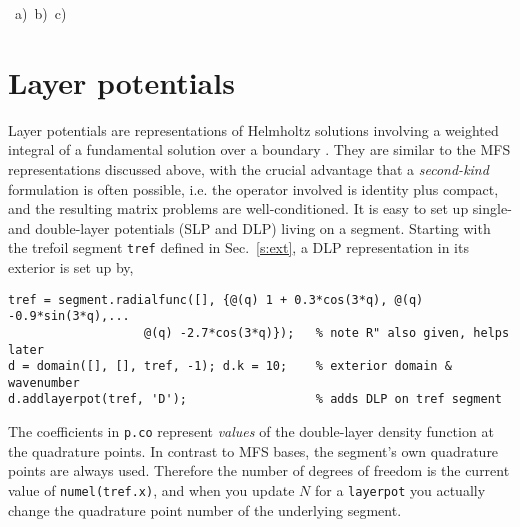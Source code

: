 \bfi %

\mbox{%
\hspace{-5ex}
a)
b)
c)
}%
\efi

\section{Layer potentials}
\label{s:layer}

Layer potentials are representations of Helmholtz solutions
involving a weighted integral of a fundamental solution
over a boundary \cite{coltonkress}.
They are similar to the MFS representations discussed above, with the
crucial advantage that a {\em second-kind}
formulation is often possible, i.e. the operator involved is
identity plus compact, and the resulting matrix problems are well-conditioned.
It is easy to set up single- and double-layer potentials (SLP and
DLP) living on a segment.
Starting with the trefoil segment {\tt tref} defined in Sec.~\ref{s:ext}, a DLP
representation in its exterior is set up by,
\begin{verbatim}
tref = segment.radialfunc([], {@(q) 1 + 0.3*cos(3*q), @(q) -0.9*sin(3*q),...
                   @(q) -2.7*cos(3*q)});   % note R" also given, helps later
d = domain([], [], tref, -1); d.k = 10;    % exterior domain & wavenumber
d.addlayerpot(tref, 'D');                  % adds DLP on tref segment
\end{verbatim}
The coefficients in {\tt p.co} represent {\em values} of the double-layer
density function at the quadrature points.
In contrast to MFS bases,
the segment's own quadrature points are always used. Therefore the
number of degrees of freedom is the current value of {\tt numel(tref.x)},
and when you update $N$ for a {\tt layerpot} you actually
change the quadrature point number of the underlying segment.

